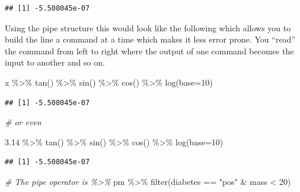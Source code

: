 \documentclass[
]{article}
\newenvironment{Shaded}{\begin{snugshade}}{\end{snugshade}}
\newcommand{\AttributeTok}[1]{\textcolor[rgb]{0.77,0.63,0.00}{#1}}
\newcommand{\CommentTok}[1]{\textcolor[rgb]{0.56,0.35,0.01}{\textit{#1}}}
\newcommand{\DecValTok}[1]{\textcolor[rgb]{0.00,0.00,0.81}{#1}}
\newcommand{\FloatTok}[1]{\textcolor[rgb]{0.00,0.00,0.81}{#1}}
\newcommand{\FunctionTok}[1]{\textcolor[rgb]{0.00,0.00,0.00}{#1}}
\newcommand{\NormalTok}[1]{#1}
\newcommand{\SpecialCharTok}[1]{\textcolor[rgb]{0.00,0.00,0.00}{#1}}
\newcommand{\StringTok}[1]{\textcolor[rgb]{0.31,0.60,0.02}{#1}}
\begin{document}
\begin{verbatim}
## [1] -5.508045e-07
\end{verbatim}

Using the pipe structure this would look like the following which allows
you to build the line a command at a time which makes it less error
prone. You ``read'' the command from left to right where the output of
one command becomes the input to another and so on.

\begin{Shaded}
\begin{Highlighting}[]
\NormalTok{x }\SpecialCharTok{\%\textgreater{}\%} \FunctionTok{tan}\NormalTok{() }\SpecialCharTok{\%\textgreater{}\%} \FunctionTok{sin}\NormalTok{() }\SpecialCharTok{\%\textgreater{}\%} \FunctionTok{cos}\NormalTok{() }\SpecialCharTok{\%\textgreater{}\%} \FunctionTok{log}\NormalTok{(}\AttributeTok{base=}\DecValTok{10}\NormalTok{)}
\end{Highlighting}
\end{Shaded}

\begin{verbatim}
## [1] -5.508045e-07
\end{verbatim}

\begin{Shaded}
\begin{Highlighting}[]
\CommentTok{\# or even}

\FloatTok{3.14} \SpecialCharTok{\%\textgreater{}\%} \FunctionTok{tan}\NormalTok{() }\SpecialCharTok{\%\textgreater{}\%} \FunctionTok{sin}\NormalTok{() }\SpecialCharTok{\%\textgreater{}\%} \FunctionTok{cos}\NormalTok{() }\SpecialCharTok{\%\textgreater{}\%} \FunctionTok{log}\NormalTok{(}\AttributeTok{base=}\DecValTok{10}\NormalTok{)}
\end{Highlighting}
\end{Shaded}

\begin{verbatim}
## [1] -5.508045e-07
\end{verbatim}

\begin{Shaded}
\begin{Highlighting}[]
\CommentTok{\# The pipe operator is \%\textgreater{}\%}
\NormalTok{pm  }\SpecialCharTok{\%\textgreater{}\%} \FunctionTok{filter}\NormalTok{(diabetes }\SpecialCharTok{==} \StringTok{"pos"} \SpecialCharTok{\&}\NormalTok{ mass }\SpecialCharTok{\textless{}} \DecValTok{20}\NormalTok{)}
\end{Highlighting}
\end{Shaded}
\end{document}
